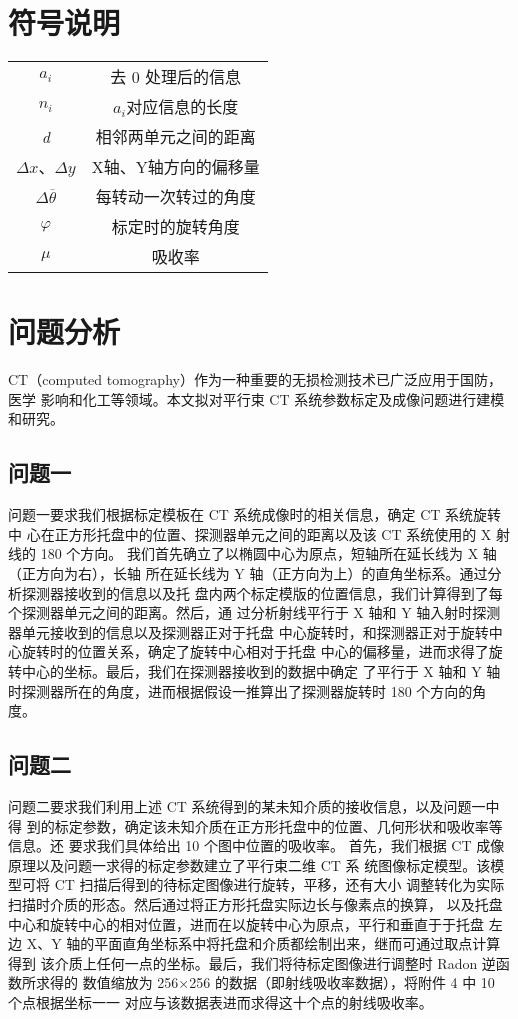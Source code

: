 \documentclass[bwprint]{cumcmthesis}
\begin{document}
\section{符号说明}
\begin{tabular}{cc}
	\hline
	\makebox[0.3\textwidth][c]{符号}	&  \makebox[0.6\textwidth][c]{定义} \\ \hline
    $\textit{a}_{i} $ & 去 0 处理后的信息\\ \hline
	$\textit{n}_{i} $ & $a_{i}$对应信息的长度 \\ \hline
	\textit{d} & 相邻两单元之间的距离 \\ \hline
	$\Delta$$\textit{x}$、$\Delta$$\textit{y}$ & X轴、Y轴方向的偏移量 \\ \hline
	$\Delta$$\overline{\theta}$ & 每转动一次转过的角度 \\ \hline
	$\varphi$ & 标定时的旋转角度 \\ \hline
	$\mu$ & 吸收率 \\ \hline
	
\end{tabular}

\section{问题分析}
CT（computed tomography）作为一种重要的无损检测技术已广泛应用于国防，医学 影响和化工等领域。本文拟对平行束 CT 系统参数标定及成像问题进行建模和研究。
\subsection{问题一}
问题一要求我们根据标定模板在 CT 系统成像时的相关信息，确定 CT 系统旋转中 心在正方形托盘中的位置、探测器单元之间的距离以及该 CT 系统使用的 X 射线的 180 个方向。 我们首先确立了以椭圆中心为原点，短轴所在延长线为 X 轴（正方向为右），长轴 所在延长线为 Y 轴（正方向为上）的直角坐标系。通过分析探测器接收到的信息以及托 盘内两个标定模版的位置信息，我们计算得到了每个探测器单元之间的距离。然后，通 过分析射线平行于 X 轴和 Y 轴入射时探测器单元接收到的信息以及探测器正对于托盘 中心旋转时，和探测器正对于旋转中心旋转时的位置关系，确定了旋转中心相对于托盘 中心的偏移量，进而求得了旋转中心的坐标。最后，我们在探测器接收到的数据中确定 了平行于 X 轴和 Y 轴时探测器所在的角度，进而根据假设一推算出了探测器旋转时 180 个方向的角度。

\subsection{问题二}
问题二要求我们利用上述 CT 系统得到的某未知介质的接收信息，以及问题一中得 到的标定参数，确定该未知介质在正方形托盘中的位置、几何形状和吸收率等信息。还 要求我们具体给出 10 个图中位置的吸收率。 首先，我们根据 CT 成像原理以及问题一求得的标定参数建立了平行束二维 CT 系 统图像标定模型。该模型可将 CT 扫描后得到的待标定图像进行旋转，平移，还有大小 调整转化为实际扫描时介质的形态。然后通过将正方形托盘实际边长与像素点的换算， 以及托盘中心和旋转中心的相对位置，进而在以旋转中心为原点，平行和垂直于于托盘 左边 X、Y 轴的平面直角坐标系中将托盘和介质都绘制出来，继而可通过取点计算得到 该介质上任何一点的坐标。最后，我们将待标定图像进行调整时 Radon 逆函数所求得的 数值缩放为 256×256 的数据（即射线吸收率数据），将附件 4 中 10 个点根据坐标一一 对应与该数据表进而求得这十个点的射线吸收率。
\end{document}
